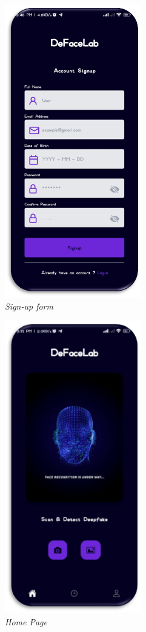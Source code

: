 \begin{figure}[ht]
    \centering
    \includegraphics[height= 5in]{img/signup.png}
    \caption{\textit{Sign-up form}}
\end{figure}
\begin{figure}[ht]
    \centering
    \includegraphics[height =5in ]{img/Homepage.png}
    \caption{\textit{Home Page}}
\end{figure}

